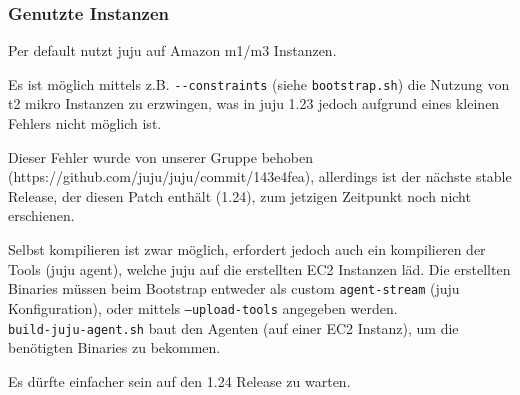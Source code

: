 \subsubsection{Genutzte Instanzen}

Per default nutzt juju auf Amazon m1/m3 Instanzen.

Es ist möglich mittels z.B. \texttt{-{}-constraints} (siehe \texttt{bootstrap.sh}) die Nutzung von t2 mikro Instanzen zu erzwingen, was in juju 1.23 jedoch aufgrund eines kleinen Fehlers nicht möglich ist.

Dieser Fehler wurde von unserer Gruppe behoben (https://github.com/juju/juju/commit/143e4fea), allerdings ist der nächste stable Release, der diesen Patch enthält (1.24), zum jetzigen Zeitpunkt noch nicht erschienen.

Selbst kompilieren ist zwar möglich, erfordert jedoch auch ein kompilieren der Tools (juju agent), welche juju auf die erstellten EC2 Instanzen läd.
Die erstellten Binaries müssen beim Bootstrap entweder als custom \texttt{agent-stream} (juju Konfiguration), oder mittels \texttt{--upload-tools} angegeben werden. \\
\texttt{build-juju-agent.sh} baut den Agenten (auf einer EC2 Instanz), um die benötigten Binaries zu bekommen.

Es dürfte einfacher sein auf den 1.24 Release zu warten.
